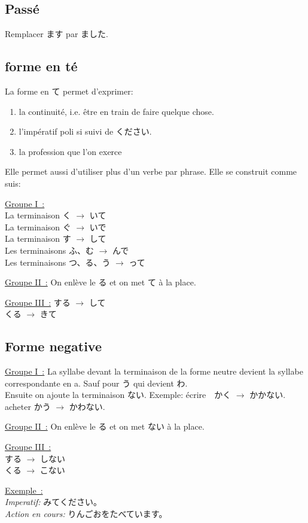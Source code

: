 \documentclass{article}
\begin{document}
\begin{CJK}{UTF8}{min}
    \subsection{Passé}
        Remplacer ます par ました.
    \subsection{forme en té}
    La forme en て permet d'exprimer:
    \begin{enumerate}
        \item la continuité, i.e. être en train de faire quelque chose.
        \item l'impératif poli si suivi de ください.
        \item la profession que l'on exerce
    \end{enumerate}
    Elle permet aussi d'utiliser plus d'un verbe par phrase.
    Elle se construit comme suis:
    \par

    \underline{Groupe I~:}\\
    La terminaison   く $\rightarrow$ いて\\
    La terminaison   ぐ $\rightarrow$ いで\\
    La terminaison   す $\rightarrow$ して\\
    Les terminaisons ふ、む $\rightarrow$ んで\\ 
    Les terminaisons  つ、る、う $\rightarrow$ って
    
\par
    \underline{Groupe II~:}
On enlève le る et on met て à la place.
    \par

    \underline{Groupe III~:}
する $\rightarrow$ して\\
くる $\rightarrow$ きて

    \subsection{Forme negative}
 \underline{Groupe I~:}
    La syllabe devant la terminaison de la forme neutre devient la syllabe correspondante en a.
Sauf pour う qui devient わ.\\
Ensuite on ajoute la terminaison ない.
Exemple: écrire　かく $\rightarrow$ かかない. \\
	 acheter かう $\rightarrow$ かわない.
 
    \underline{Groupe II~:}
On enlève le る et on met ない à la place.

    \underline{Groupe III~:}\\
する $\rightarrow$ しない\\
くる $\rightarrow$ こない

\par
\underline{Exemple~:} \\
\textit{Imperatif:} みてください。\\
\textit{Action en cours:} りんごおをたべています。

\end{CJK}
\end{document}
